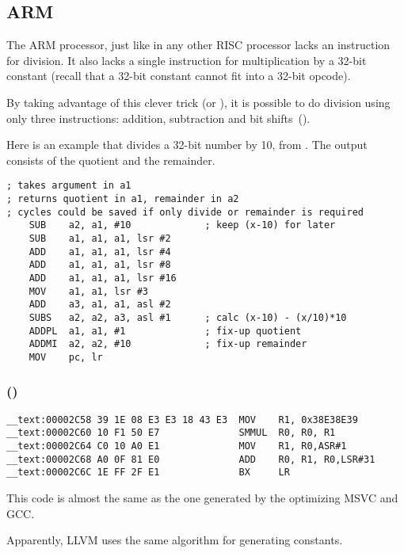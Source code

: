 ﻿\subsection{ARM}

The ARM processor, just like in any other  RISC processor lacks an instruction for division.
It also lacks a single instruction for multiplication by a 32-bit constant (recall that a 32-bit
constant cannot fit into a 32-bit opcode).

By taking advantage of this clever trick (or ), it is possible to do division using only three instructions: addition,
subtraction and bit shifts~().

Here is an example that divides a 32-bit number by 10, from
.
The output consists of the quotient and the remainder.

\begin{lstlisting}
; takes argument in a1
; returns quotient in a1, remainder in a2
; cycles could be saved if only divide or remainder is required
    SUB    a2, a1, #10             ; keep (x-10) for later
    SUB    a1, a1, a1, lsr #2
    ADD    a1, a1, a1, lsr #4
    ADD    a1, a1, a1, lsr #8
    ADD    a1, a1, a1, lsr #16
    MOV    a1, a1, lsr #3
    ADD    a3, a1, a1, asl #2
    SUBS   a2, a2, a3, asl #1      ; calc (x-10) - (x/10)*10
    ADDPL  a1, a1, #1              ; fix-up quotient
    ADDMI  a2, a2, #10             ; fix-up remainder
    MOV    pc, lr
\end{lstlisting}

\subsubsection{\OptimizingXcodeIV (\ARMMode)}

\begin{lstlisting}
__text:00002C58 39 1E 08 E3 E3 18 43 E3  MOV    R1, 0x38E38E39
__text:00002C60 10 F1 50 E7              SMMUL  R0, R0, R1
__text:00002C64 C0 10 A0 E1              MOV    R1, R0,ASR#1
__text:00002C68 A0 0F 81 E0              ADD    R0, R1, R0,LSR#31
__text:00002C6C 1E FF 2F E1              BX     LR
\end{lstlisting}

This code is almost the same as the one generated by the optimizing MSVC and GCC.

Apparently, LLVM uses the same algorithm for generating constants.


